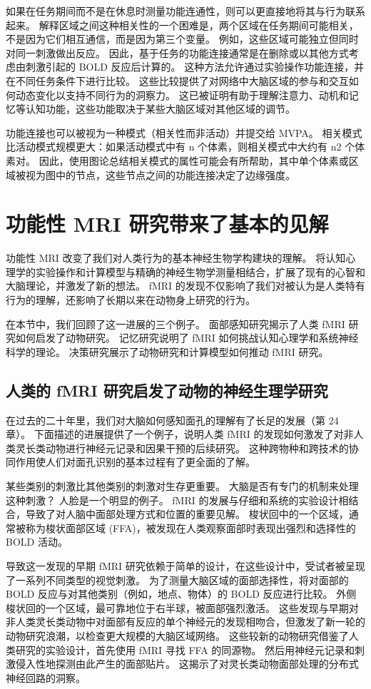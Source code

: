 如果在任务期间而不是在休息时测量功能连通性，则可以更直接地将其与行为联系起来。 解释区域之间这种相关性的一个困难是，两个区域在任务期间可能相关，不是因为它们相互通信，而是因为第三个变量。 例如，这些区域可能独立但同时对同一刺激做出反应。 因此，基于任务的功能连接通常是在删除或以其他方式考虑由刺激引起的 BOLD 反应后计算的。 这种方法允许通过实验操作功能连接，并在不同任务条件下进行比较。 这些比较提供了对网络中大脑区域的参与和交互如何动态变化以支持不同行为的洞察力。 这已被证明有助于理解注意力、动机和记忆等认知功能，这些功能取决于某些大脑区域对其他区域的调节。

功能连接也可以被视为一种模式（相关性而非活动）并提交给 MVPA。 相关模式比活动模式规模更大：如果活动模式中有 n 个体素，则相关模式中大约有 n2 个体素对。 因此，使用图论总结相关模式的属性可能会有所帮助，其中单个体素或区域被视为图中的节点，这些节点之间的功能连接决定了边缘强度。


\section{功能性 MRI 研究带来了基本的见解}
功能性 MRI 改变了我们对人类行为的基本神经生物学构建块的理解。 将认知心理学的实验操作和计算模型与精确的神经生物学测量相结合，扩展了现有的心智和大脑理论，并激发了新的想法。 fMRI 的发现不仅影响了我们对被认为是人类特有行为的理解，还影响了长期以来在动物身上研究的行为。

在本节中，我们回顾了这一进展的三个例子。 面部感知研究揭示了人类 fMRI 研究如何启发了动物研究。 记忆研究说明了 fMRI 如何挑战认知心理学和系统神经科学的理论。 决策研究展示了动物研究和计算模型如何推动 fMRI 研究。

\subsection{人类的 fMRI 研究启发了动物的神经生理学研究}
在过去的二十年里，我们对大脑如何感知面孔的理解有了长足的发展（第 24 章）。 下面描述的进展提供了一个例子，说明人类 fMRI 的发现如何激发了对非人类灵长类动物进行神经元记录和因果干预的后续研究。 这种跨物种和跨技术的协同作用使人们对面孔识别的基本过程有了更全面的了解。

某些类别的刺激比其他类别的刺激对生存更重要。 大脑是否有专门的机制来处理这种刺激？ 人脸是一个明显的例子。 fMRI 的发展与仔细和系统的实验设计相结合，导致了对人脑中面部处理方式和位置的重要见解。 梭状回中的一个区域，通常被称为梭状面部区域 (FFA)，被发现在人类观察面部时表现出强烈和选择性的 BOLD 活动。

导致这一发现的早期 fMRI 研究依赖于简单的设计，在这些设计中，受试者被呈现了一系列不同类型的视觉刺激。 为了测量大脑区域的面部选择性，将对面部的 BOLD 反应与对其他类别（例如，地点、物体）的 BOLD 反应进行比较。 外侧梭状回的一个区域，最可靠地位于右半球，被面部强烈激活。 这些发现与早期对非人类灵长类动物中对面部有反应的单个神经元的发现相吻合，但激发了新一轮的动物研究浪潮，以检查更大规模的大脑区域网络。 这些较新的动物研究借鉴了人类研究的实验设计，首先使用 fMRI 寻找 FFA 的同源物。 然后用神经元记录和刺激侵入性地探测由此产生的面部贴片。 这揭示了对灵长类动物面部处理的分布式神经回路的洞察。

